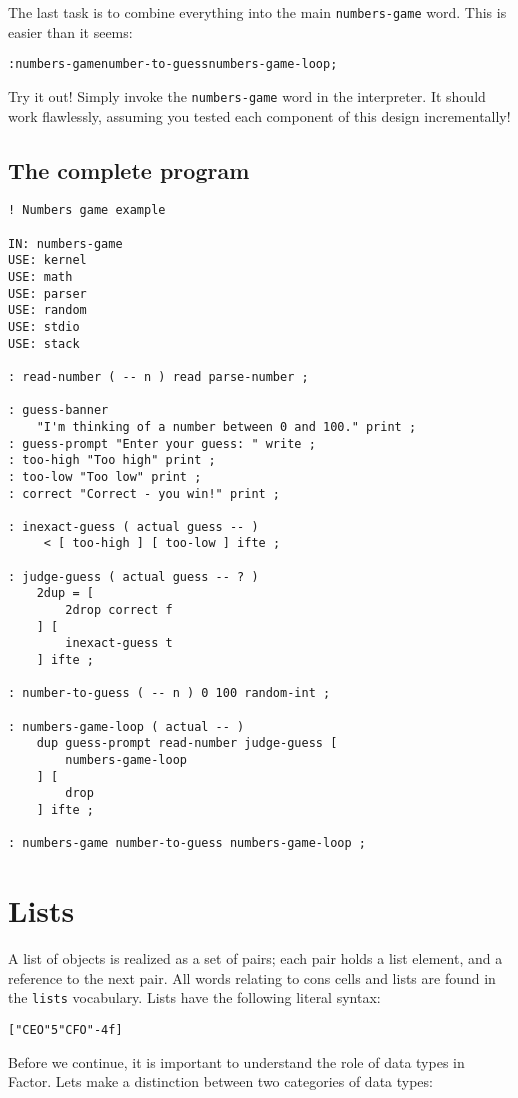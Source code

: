 \documentclass[english]{article}
\begin{document}
The last task is to combine everything into the main \texttt{numbers-game}
word. This is easier than it seems:

\begin{alltt}
: numbers-game number-to-guess numbers-game-loop ;
\end{alltt}
Try it out! Simply invoke the \texttt{numbers-game} word in the interpreter.
It should work flawlessly, assuming you tested each component of this
design incrementally!


\subsection{The complete program}

\begin{verbatim}
! Numbers game example

IN: numbers-game
USE: kernel
USE: math
USE: parser
USE: random
USE: stdio
USE: stack

: read-number ( -- n ) read parse-number ;

: guess-banner
    "I'm thinking of a number between 0 and 100." print ;
: guess-prompt "Enter your guess: " write ;
: too-high "Too high" print ;
: too-low "Too low" print ;
: correct "Correct - you win!" print ;

: inexact-guess ( actual guess -- )
     < [ too-high ] [ too-low ] ifte ;

: judge-guess ( actual guess -- ? )
    2dup = [
        2drop correct f
    ] [
        inexact-guess t
    ] ifte ;

: number-to-guess ( -- n ) 0 100 random-int ;

: numbers-game-loop ( actual -- )
    dup guess-prompt read-number judge-guess [
        numbers-game-loop
    ] [
        drop
    ] ifte ;

: numbers-game number-to-guess numbers-game-loop ;
\end{verbatim}

\section{Lists}

A list of objects is realized as a set of pairs; each pair holds a list element,
and a reference to the next pair. All words relating to cons cells and lists are found in the \texttt{lists}
vocabulary.  Lists have the following literal
syntax:

\begin{alltt}
{[} "CEO" 5 "CFO" -4 f {]}
\end{alltt}
Before we continue, it is important to understand the role of data
types in Factor. Lets make a distinction between two categories of
data types:
\end{document}
